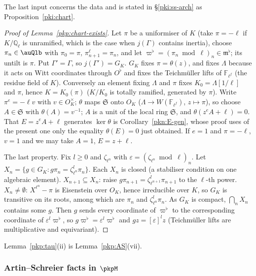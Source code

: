 \documentclass[10pt]{amsart}
\theoremstyle{definition}
\theoremstyle{remark}
\newcommand{\Q}{\mathbb Q}
\begin{document}
The last input concerns the data and is stated in \S\ref{pki:ss-arch} as
Proposition~\ref{pki:chart}.

\begin{proof}[Proof of Lemma~\ref{pkp:chart-exists}]
Let $\pi$ be a uniformiser of $K$ (take $\pi=-\ell$ if $K/\Q_\ell$ is unramified, which is the
case when $j(\Gamma)$ contains inertia), choose $\pi_n\in\auQlb$ with $\pi_0=\pi$, $\pi_{n+1}^\ell=\pi_n$,
and let $\varpi^\flat=(\pi_n\bmod\ell)_n\in\mathfrak m^\flat$; its untilt is $\pi$. Put
$\Gamma'=\Gamma$, so $j(\Gamma')=G_K$. $G_K$ fixes $\pi=\theta(z)$, and fixes $\Lambda$ because it acts on
Witt coordinates through $O^\flat$ and fixes the Teichm\"uller lifts of $\mathbb F_{\ell^f}$ (the
residue field of $K$). Conversely an element fixing $\Lambda$ and $\pi$ fixes $K_0=\Lambda[1/\ell]$ and
$\pi$, hence $K=K_0(\pi)$ ($K/K_0$ is totally ramified, generated by $\pi$). Write $\pi^e=-\ell v$ with
$v\in O_K^\times$; $\theta$ maps $\mathfrak S$ onto $O_K$ ($\Lambda\to W(\mathbb F_{\ell^f})$, $z\mapsto\pi$),
so choose $A\in\mathfrak S$ with $\theta(A)=v^{-1}$; $A$ is a unit of the local ring $\mathfrak S$, and
$\theta(z^eA+\ell)=0$. That $E=z^eA+\ell$ generates $\ker\theta$ is Corollary~\ref{pkn:E-gen}, whose proof uses of the present one only the equality $\theta(E)=0$ just obtained.
If $e=1$ and $\pi=-\ell$, $v=1$ and we may take $A=1$, $E=z+\ell$.

The last property. Fix $l\ge0$ and $\zeta_{\ell^n}$ with $\varepsilon=(\zeta_{\ell^n}\bmod\ell)_n$.
Let $X_n=\{g\in G_K:g\pi_n=\zeta_{\ell^n}^l\pi_n\}$. Each $X_n$ is closed (a stabiliser condition on
one algebraic element). $X_{n+1}\subseteq X_n$: raise $g\pi_{n+1}=\zeta_{\ell^{n+1}}^l\pi_{n+1}$ to the
$\ell$-th power. $X_n\ne\emptyset$: $X^{\ell^n}-\pi$ is Eisenstein over $O_K$, hence irreducible over
$K$, so $G_K$ is transitive on its roots, among which are $\pi_n$ and $\zeta_{\ell^n}^l\pi_n$. As
$G_K$ is compact, $\bigcap_nX_n$ contains some $g$. Then $g$ sends every coordinate of $\varpi^\flat$ to
the corresponding coordinate of $\varepsilon^l\varpi^\flat$, so $g\varpi^\flat=\varepsilon^l\varpi^\flat$
and $gz=[\varepsilon]^lz$ (Teichm\"uller lifts are multiplicative and equivariant).
\end{proof}

Lemma~\ref{pkp:tau}(ii) is Lemma~\ref{pkp:AS}(vii).

\subsubsection{Artin--Schreier facts in $\pkpM$}\label{pkp:ss-AS}
\end{document}
